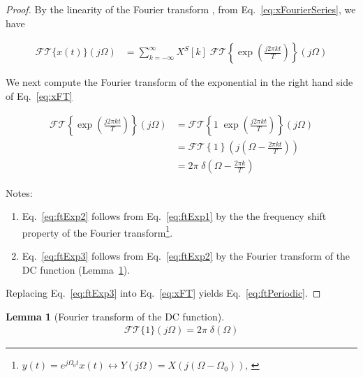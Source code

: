 \documentclass[12pt]{article}
\newtheorem{lemma}{Lemma}
\begin{document}
\begin{appendices}
\begin{proof}
        By the linearity of the Fourier transform \citep[][Eq. 2.4]{porat97}, from Eq.~\ref{eq:xFourierSeries},
        we have

        \begin{align}
            \mathcal{FT}\{x(t)\}(j\Omega)&=\sum_{k=-\infty}^\infty
            X^S[k]\;\mathcal{FT}\left\{\exp\left(\frac{j2\pi
            kt}{T}\right)\right\}(j\Omega)\label{eq:xFT}
        \end{align}

        We next compute the Fourier transform of the exponential in the right hand
        side of Eq.~\ref{eq:xFT}

        \begin{align}
            \mathcal{FT}\left\{\exp\left(\frac{j2\pi
            kt}{T}\right)\right\}(j\Omega)&=\mathcal{FT}\left\{1\; \exp\left(\frac{j2\pi kt}{T}\right)\right\}(j\Omega)\label{eq:ftExp1}\\
                                          &=\mathcal{FT}\left\{1\right\}\left(j\left(\Omega-\frac{2\pi kt}{T}\right)\right)\label{eq:ftExp2}\\
                                          &=2\pi\;\delta\left(\Omega-\frac{2\pi k}{T}\right)\label{eq:ftExp3}
        \end{align}

        Notes:
        \begin{enumerate}

            \item Eq.~\ref{eq:ftExp2} follows from Eq.~\ref{eq:ftExp1} by the
                the frequency shift property of the Fourier
                transform\footnote{$y(t)=e^{j\Omega_0 t}x(t)\leftrightarrow
                Y(j\Omega)=X\left(j(\Omega-\Omega_0)\right)$, \citet[][Section
                2.1]{porat97}}.

            \item Eq.~\ref{eq:ftExp3} follows from Eq.~\ref{eq:ftExp2} by the
                Fourier transform of the DC function (Lemma~\ref{lemma:ftDC}).

        \end{enumerate}

        Replacing Eq.~\ref{eq:ftExp3} into Eq.~\ref{eq:xFT}
        yields Eq.~\ref{eq:ftPeriodic}.

    \end{proof}

    \begin{lemma}[Fourier transform of the DC function]
        \begin{align}
            \mathcal{FT}\{1\}(j\Omega)=2\pi\;\delta(\Omega)
        \end{align}
        \label{lemma:ftDC}
    \end{lemma}


\end{appendices}
\end{document}
